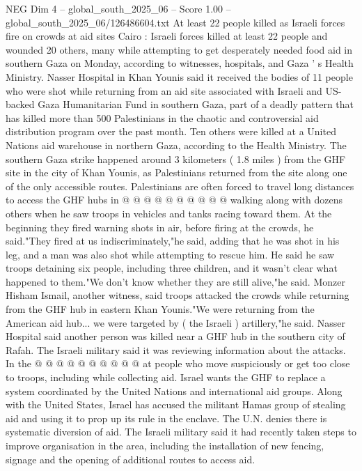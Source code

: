 \begin{textsample}{NEG Dim 4 – global\_south\_2025\_06 – Score 1.00 – global\_south\_2025\_06/126486604.txt}  \label{ex:f4_neg_102}
At least 22 people killed as Israeli forces fire on crowds at aid sites Cairo : Israeli forces killed at least 22 people and wounded 20 others, many while attempting to get desperately needed food aid in southern Gaza on Monday, according to witnesses, hospitals, and Gaza ' s Health Ministry.
Nasser Hospital in Khan Younis said it received the bodies of 11 people who were shot while returning from an aid site associated with Israeli and US-backed Gaza Humanitarian Fund in southern Gaza, part of a deadly pattern that has killed more than 500 Palestinians in the chaotic and controversial aid distribution program over the past month.
Ten others were killed at a United Nations aid warehouse in northern Gaza, according to the Health Ministry.
The southern Gaza strike happened around 3 kilometers ( 1.8 miles ) from the GHF site in the city of Khan Younis, as Palestinians returned from the site along one of the only accessible routes.
Palestinians are often forced to travel long distances to access the GHF hubs in @ @ @ @ @ @ @ @ @ @ walking along with dozens others when he saw troops in vehicles and tanks racing toward them.
At the beginning they fired warning shots in air, before firing at the crowds, he said."They fired at us indiscriminately,"he said, adding that he was shot in his leg, and a man was also shot while attempting to rescue him.
He said he saw troops detaining six people, including three children, and it wasn't clear what happened to them."We don't know whether they are still alive,"he said.
Monzer Hisham Ismail, another witness, said troops attacked the crowds while returning from the GHF hub in eastern Khan Younis."We were returning from the American aid hub... we were targeted by ( the Israeli ) artillery,"he said.
Nasser Hospital said another person was killed near a GHF hub in the southern city of Rafah.
The Israeli military said it was reviewing information about the attacks.
In the @ @ @ @ @ @ @ @ @ @ at people who move suspiciously or get too close to troops, including while collecting aid.
Israel wants the GHF to replace a system coordinated by the United Nations and international aid groups.
Along with the United States, Israel has accused the militant Hamas group of stealing aid and using it to prop up its rule in the enclave.
The U.N. denies there is systematic diversion of aid.
The Israeli military said it had recently taken steps to improve organisation in the area, including the installation of new fencing, signage and the opening of additional routes to access aid.

\end{textsample}
